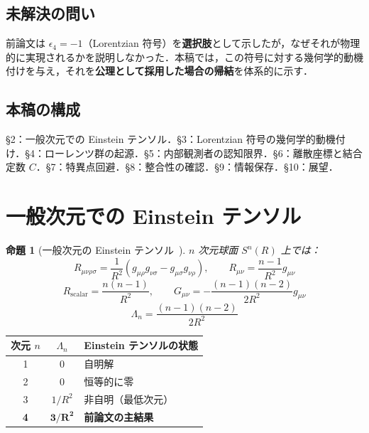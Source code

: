 \documentclass[12pt,a4paper]{ltjsarticle}
\newtheorem{proposition}[theorem]{命題}
\begin{document}
\subsection{未解決の問い}

前論文は $\epsilon_4 = -1$（Lorentzian 符号）を\textbf{選択肢}として示したが，なぜそれが物理的に実現されるかを説明しなかった．本稿では，この符号に対する幾何学的動機付けを与え，それを\textbf{公理として採用した場合の帰結}を体系的に示す．

\subsection{本稿の構成}

\S2：一般次元での Einstein テンソル．\S3：Lorentzian 符号の幾何学的動機付け．\S4：ローレンツ群の起源．\S5：内部観測者の認知限界．\S6：離散座標と結合定数 $C$．\S7：特異点回避．\S8：整合性の確認．\S9：情報保存．\S10：展望．

\section{一般次元での Einstein テンソル}

\begin{proposition}[一般次元の Einstein テンソル~{\normalfont\cite{doCarmo1992,Wald1984}}]\label{prop:general}
$n$ 次元球面 $S^n(R)$ 上では：
\begin{equation}
R_{\mu\nu\rho\sigma} = \frac{1}{R^2}(g_{\mu\rho}g_{\nu\sigma} - g_{\mu\sigma}g_{\nu\rho}), \qquad R_{\mu\nu} = \frac{n-1}{R^2}g_{\mu\nu} \tag{2.1}
\end{equation}
\begin{equation}
R_{\text{scalar}} = \frac{n(n-1)}{R^2}, \qquad G_{\mu\nu} = -\frac{(n-1)(n-2)}{2R^2}g_{\mu\nu} \tag{2.2}
\end{equation}
\begin{equation}
\Lambda_n = \frac{(n-1)(n-2)}{2R^2} \tag{2.3}
\end{equation}
\end{proposition}

\begin{center}
\begin{tabular}{ccl}
\toprule
次元 $n$ & $\Lambda_n$ & Einstein テンソルの状態 \\
\midrule
1 & 0 & 自明解 \\
2 & 0 & 恒等的に零 \\
3 & $1/R^2$ & 非自明（最低次元） \\
\textbf{4} & $\mathbf{3/R^2}$ & \textbf{前論文の主結果} \\
\bottomrule
\end{tabular}
\end{center}
\end{document}
